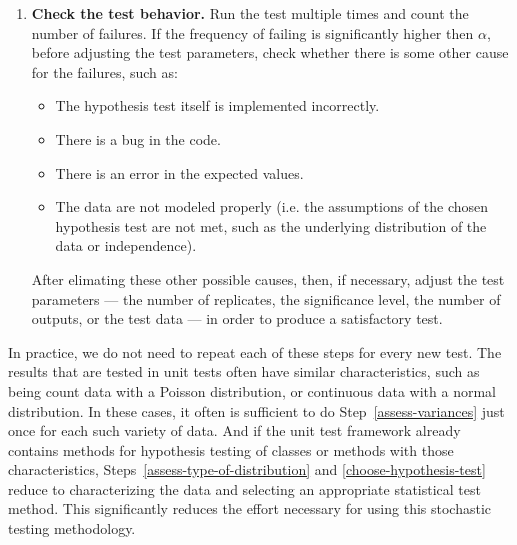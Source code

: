 \begin{enumerate}
\item
{\bf Check the test behavior.}
Run the test multiple times and count the number of failures. If the frequency
of failing is significantly higher then $\alpha$, before adjusting the test
parameters, check whether there is some other cause for the failures, such as:
\begin{itemize}
\item The hypothesis test itself is implemented incorrectly.
\item There is a bug in the code.
\item There is an error in the expected values.
\item The data are not modeled properly (i.e. the assumptions of the
  chosen hypothesis test are not met, such as the underlying distribution of
  the data or independence). 
\end{itemize}

After elimating these other possible causes, then, if necessary, adjust the
test parameters --- the number of replicates, the significance level, the
number of outputs, or the test data --- in order to produce a satisfactory
test.

\end{enumerate}


In practice, we do not need to repeat each of these steps for every new
test.  The results that are tested in unit tests often have similar
characteristics, such as being count data with a Poisson distribution, or
continuous data with a normal distribution.  In these cases, it often is
sufficient to do Step~\ref{assess-variances} just once for each such
variety of data.  And if the unit test framework already contains methods
for hypothesis testing of classes or methods with those characteristics,
Steps~\ref{assess-type-of-distribution} and \ref{choose-hypothesis-test}
reduce to characterizing the data and selecting an appropriate statistical
test method.  This significantly reduces the effort necessary for using
this stochastic testing methodology.



